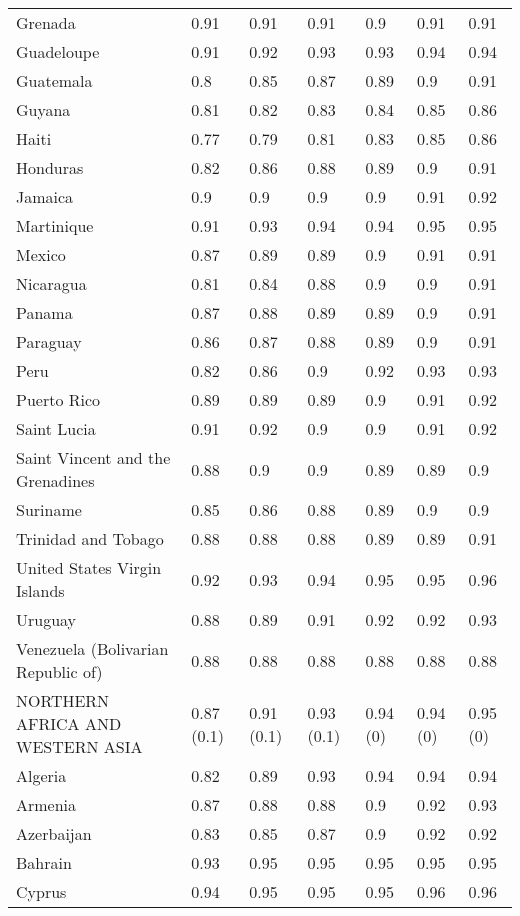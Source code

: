 \begin{longtable}[t]{lllllll}
Grenada & 0.91 & 0.91 & 0.91 & 0.9 & 0.91 & 0.91\\
Guadeloupe & 0.91 & 0.92 & 0.93 & 0.93 & 0.94 & 0.94\\
Guatemala & 0.8 & 0.85 & 0.87 & 0.89 & 0.9 & 0.91\\
Guyana & 0.81 & 0.82 & 0.83 & 0.84 & 0.85 & 0.86\\
Haiti & 0.77 & 0.79 & 0.81 & 0.83 & 0.85 & 0.86\\
Honduras & 0.82 & 0.86 & 0.88 & 0.89 & 0.9 & 0.91\\
Jamaica & 0.9 & 0.9 & 0.9 & 0.9 & 0.91 & 0.92\\
Martinique & 0.91 & 0.93 & 0.94 & 0.94 & 0.95 & 0.95\\
Mexico & 0.87 & 0.89 & 0.89 & 0.9 & 0.91 & 0.91\\
Nicaragua & 0.81 & 0.84 & 0.88 & 0.9 & 0.9 & 0.91\\
Panama & 0.87 & 0.88 & 0.89 & 0.89 & 0.9 & 0.91\\
Paraguay & 0.86 & 0.87 & 0.88 & 0.89 & 0.9 & 0.91\\
Peru & 0.82 & 0.86 & 0.9 & 0.92 & 0.93 & 0.93\\
Puerto Rico & 0.89 & 0.89 & 0.89 & 0.9 & 0.91 & 0.92\\
Saint Lucia & 0.91 & 0.92 & 0.9 & 0.9 & 0.91 & 0.92\\
Saint Vincent and the Grenadines & 0.88 & 0.9 & 0.9 & 0.89 & 0.89 & 0.9\\
Suriname & 0.85 & 0.86 & 0.88 & 0.89 & 0.9 & 0.9\\
Trinidad and Tobago & 0.88 & 0.88 & 0.88 & 0.89 & 0.89 & 0.91\\
United States Virgin Islands & 0.92 & 0.93 & 0.94 & 0.95 & 0.95 & 0.96\\
Uruguay & 0.88 & 0.89 & 0.91 & 0.92 & 0.92 & 0.93\\
Venezuela (Bolivarian Republic of) & 0.88 & 0.88 & 0.88 & 0.88 & 0.88 & 0.88\\
NORTHERN AFRICA AND WESTERN ASIA & 0.87 (0.1) & 0.91 (0.1) & 0.93 (0.1) & 0.94 (0) & 0.94 (0) & 0.95 (0)\\
Algeria & 0.82 & 0.89 & 0.93 & 0.94 & 0.94 & 0.94\\
Armenia & 0.87 & 0.88 & 0.88 & 0.9 & 0.92 & 0.93\\
Azerbaijan & 0.83 & 0.85 & 0.87 & 0.9 & 0.92 & 0.92\\
Bahrain & 0.93 & 0.95 & 0.95 & 0.95 & 0.95 & 0.95\\
Cyprus & 0.94 & 0.95 & 0.95 & 0.95 & 0.96 & 0.96\\

\end{longtable}
